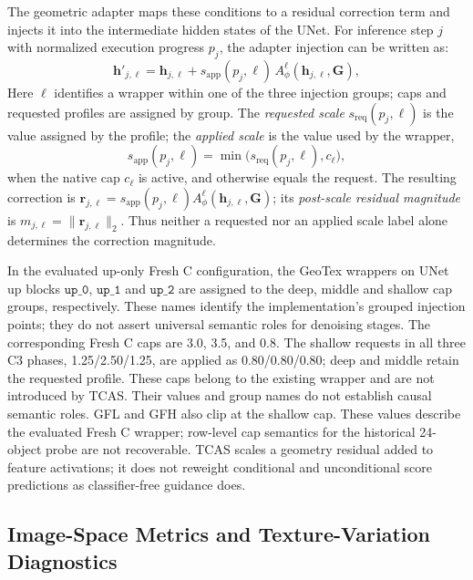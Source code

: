 \documentclass[times,twocolumn,final]{elsarticle}
\begin{document}
The geometric adapter maps these conditions to a residual correction term and injects it into the intermediate hidden states of the UNet. For inference step $j$ with normalized execution progress $p_j$, the adapter injection can be written as:
\begin{equation}
\mathbf{h}'_{j,\ell} = \mathbf{h}_{j,\ell} + s_{\mathrm{app}}(p_j,\ell)\, A^\ell_\phi(\mathbf{h}_{j,\ell}, \mathbf{G}),
\label{eq:injection}
\end{equation}
Here $\ell$ identifies a wrapper within one of the three injection groups; caps and requested profiles are assigned by group. The \emph{requested scale} $s_{\mathrm{req}}(p_j,\ell)$ is the value assigned by the profile; the \emph{applied scale} is the value used by the wrapper,
\begin{equation}
s_{\mathrm{app}}(p_j,\ell)=\min\!\bigl(s_{\mathrm{req}}(p_j,\ell),c_\ell\bigr),
\end{equation}
when the native cap $c_\ell$ is active, and otherwise equals the request. The resulting correction is $\mathbf{r}_{j,\ell}=s_{\mathrm{app}}(p_j,\ell)A^\ell_\phi(\mathbf{h}_{j,\ell},\mathbf{G})$; its \emph{post-scale residual magnitude} is $m_{j,\ell}=\|\mathbf{r}_{j,\ell}\|_2$. Thus neither a requested nor an applied scale label alone determines the correction magnitude.

In the evaluated up-only Fresh C configuration, the GeoTex wrappers on UNet up blocks $\texttt{up\_0}$, $\texttt{up\_1}$ and $\texttt{up\_2}$ are assigned to the deep, middle and shallow cap groups, respectively. These names identify the implementation's grouped injection points; they do not assert universal semantic roles for denoising stages. The corresponding Fresh C caps are 3.0, 3.5, and 0.8. The shallow requests in all three C3 phases, 1.25/2.50/1.25, are applied as 0.80/0.80/0.80; deep and middle retain the requested profile. These caps belong to the existing wrapper and are not introduced by TCAS. Their values and group names do not establish causal semantic roles. GFL and GFH also clip at the shallow cap. These values describe the evaluated Fresh C wrapper; row-level cap semantics for the historical 24-object probe are not recoverable. TCAS scales a geometry residual added to feature activations; it does not reweight conditional and unconditional score predictions as classifier-free guidance does.

\subsection{Image-Space Metrics and Texture-Variation Diagnostics}
\label{subsec:metrics}
\end{document}
